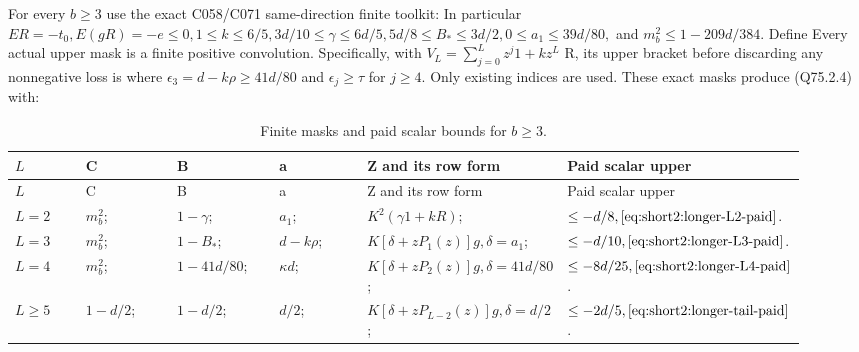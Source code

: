 For every \(b\ge 3\) use the exact C058/C071 same-direction finite toolkit:
In particular \(ER=-t_0,\allowbreak  E(gR)=-e\le 0,\allowbreak  1\le k\le 6/5,\allowbreak  3d/10\le \gamma\le 6d/5,\allowbreak  5d/8\le B_*\le 3d/2,\allowbreak  0\le a_1\le 39d/80,\allowbreak \) and \(m_b^2\le 1-209d/384.\)
Define
Every actual upper mask is a finite positive convolution. Specifically,
with \(V_L=\sum _{j=0}^L z^j1+kz^L\) R, its upper bracket before discarding
any nonnegative loss is
where \(\epsilon_3=d-k \rho\ge 41d/80\) and \(\epsilon_j\ge \tau\) for \(j\ge 4.\)
Only existing indices are used. These exact masks produce (Q75.2.4) with:


\begingroup\small
\setlength{\tabcolsep}{3pt}
\setlength{\LTleft}{0pt}\setlength{\LTright}{\fill}
\begin{longtable}{@{}>{\raggedright\arraybackslash}p{0.1200\linewidth}>{\raggedright\arraybackslash}p{0.1600\linewidth}>{\raggedright\arraybackslash}p{0.1600\linewidth}>{\raggedright\arraybackslash}p{0.1600\linewidth}>{\raggedright\arraybackslash}p{0.1600\linewidth}>{\raggedright\arraybackslash}p{0.1600\linewidth}@{}}
\caption{Finite masks and paid scalar bounds for \(b\ge3\).}\label{tab:parameters:q5-c075:2}\\
\toprule
\(L\) & C & B & a & Z and its row form & Paid scalar upper \\
\midrule\endfirsthead
\toprule
\(L\) & C & B & a & Z and its row form & Paid scalar upper \\
\midrule\endhead
\bottomrule\endfoot
\(L=2\) & \(m_b^2\); & \(1-\gamma\); & \(a_1\); & \(K^2(\gamma 1+kR)\); & \(\le -d/8,\allowbreak  \eqref{eq:short2:longer-L2-paid}\). \\
\addlinespace[2pt]
\(L=3\) & \(m_b^2\); & \(1-B_*\); & \(d-k \rho\); & \(K[\delta+zP_1(z)]g,\allowbreak  \delta=a_1\); & \(\le -d/10,\allowbreak  \eqref{eq:short2:longer-L3-paid}\). \\
\addlinespace[2pt]
\(L=4\) & \(m_b^2\); & \(1-41d/80\); & \(\kappa d\); & \(K[\delta+zP_2(z)]g,\allowbreak  \delta=41d/80\); & \(\le -8d/25,\allowbreak  \eqref{eq:short2:longer-L4-paid}\). \\
\addlinespace[2pt]
\(L\ge 5\) & \(1-d/2\); & \(1-d/2\); & \(d/2\); & \(K[\delta+zP_{L-2}(z)]g,\allowbreak  \delta=d/2\); & \(\le -2d/5,\allowbreak  \eqref{eq:short2:longer-tail-paid}\). \\
\end{longtable}
\endgroup


